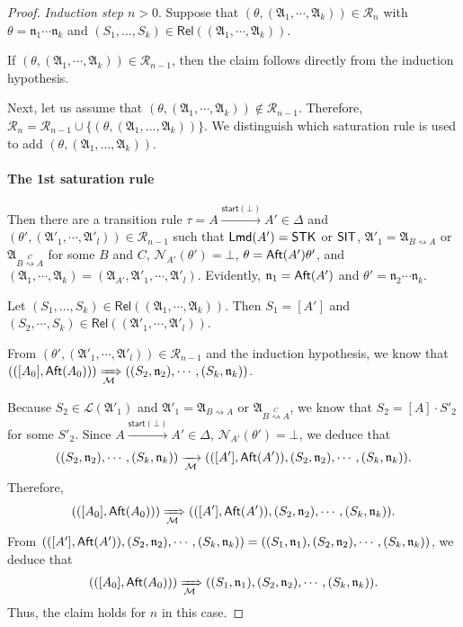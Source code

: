 \documentclass[preprint,12pt]{elsarticle}
\newcommand\Mm{{\mathcal{M} }}
\newcommand\act{{\sf Act}}
\newcommand\aft{{\sf Aft}}
\newcommand\lmd{{\sf Lmd}}
\newcommand\singletask{{\sf STK}}
\newcommand\singleinstance{{\sf SIT}}
\newcommand\startactivity{{\mathsf{start} }}
\newcommand\namefun{\mathcal{N}}
\newcommand\aname{\mathfrak{n}}
\newcommand\AutReach{\mathscr{R}}
\newcommand\Rel{\mathsf{Rel}}
\newcommand{\STK}{\mathsf{STK}}
\newcommand\Aut{{\mathfrak{A} }}
\newcommand\Lang{{\mathscr{L} }}
\begin{document}
\begin{proof}
\smallskip

\noindent \emph{Induction step $n > 0$}. 
Suppose that $(\theta, (\Aut_1, \cdots, \Aut_k)) \in \AutReach_n$ with $\theta = \aname_1 \cdots \aname_k$ and $(S_1,\dots,S_k) \in \Rel((\Aut_1, \cdots, \Aut_k))$. 

If $(\theta, (\Aut_1, \cdots, \Aut_k)) \in \AutReach_{n-1}$, then the claim follows directly from the induction hypothesis. 

Next, let us assume that $(\theta, (\Aut_1, \cdots, \Aut_k)) \not \in  \AutReach_{n-1}$.
Therefore, $\AutReach_{n} = \AutReach_{n-1} \cup \{(\theta,(\Aut_1,\dots,\Aut_k))\}$.  
%
We distinguish which saturation rule is used to add $(\theta,(\Aut_1,\dots,\Aut_k))$.


\paragraph*{The 1st saturation rule} Then  there are a transition rule $\tau = A \xrightarrow{\startactivity(\bot)} A'  \in \Delta$ and $(\theta', (\Aut'_1, \cdots, \Aut'_l)) \in \AutReach_{n-1}$ such that $\lmd(A')=\STK$ or $\singleinstance$, $\Aut'_1 = \Aut_{B \rightsquigarrow A}$ or $\Aut_{B \stackrel{C}{\rightsquigarrow} A}$ for some $B$ and $C$,
$\namefun_{A'}(\theta') = \bot$, $\theta = \aft(A') \theta'$, and $(\Aut_1, \cdots, \Aut_k) = (\Aut_{A'}, \Aut'_1, \cdots, \Aut'_l)$. 
Evidently, $\aname_1 = \aft(A')$ and $\theta' = \aname_2 \cdots \aname_k$. 

Let $(S_1,\dots,S_k) \in \Rel((\Aut_1, \cdots, \Aut_k))$. Then $S_1 = [A']$ and $(S_2, \cdots, S_k) \in \Rel((\Aut'_1, \cdots, \Aut'_l))$. 

From $(\theta', (\Aut'_1, \cdots, \Aut'_l)) \in \AutReach_{n-1}$ and the induction hypothesis, we know that $(([A_0], \aft(A_0))) \xRightarrow[\Mm]{} ((S_2, \aname_2), \cdots, (S_k, \aname_k))$. 

Because $S_2 \in \Lang(\Aut'_1)$ and $\Aut'_1 = \Aut_{B \rightsquigarrow A}$ or $\Aut_{B \stackrel{C}{\rightsquigarrow} A}$, we know that $S_2 = [A] \cdot S'_2$ for some $S'_2$.  
Since $A \xrightarrow{\startactivity(\bot)}A'  \in \Delta$, $\namefun_{A'}(\theta') = \bot$, we deduce that 
$$((S_2, \aname_2), \cdots, (S_k, \aname_k)) \xrightarrow[\Mm]{} (([A'], \aft(A')), (S_2, \aname_2), \cdots, (S_k, \aname_k)).$$
Therefore, 
$$(([A_0], \aft(A_0))) \xRightarrow[\Mm]{} (([A'], \aft(A')), (S_2, \aname_2), \cdots, (S_k, \aname_k)).$$ 
%
From $(([A'], \aft(A')), (S_2, \aname_2), \cdots, (S_k, \aname_k)) = ((S_1, \aname_1), (S_2, \aname_2), \cdots, (S_k, \aname_k))$, we deduce that  
$$(([A_0], \aft(A_0))) \xRightarrow[\Mm]{} ((S_1, \aname_1), (S_2, \aname_2), \cdots, (S_k, \aname_k)).$$ 
Thus, the claim holds for $n$ in this case. 


\end{proof}
\end{document}
